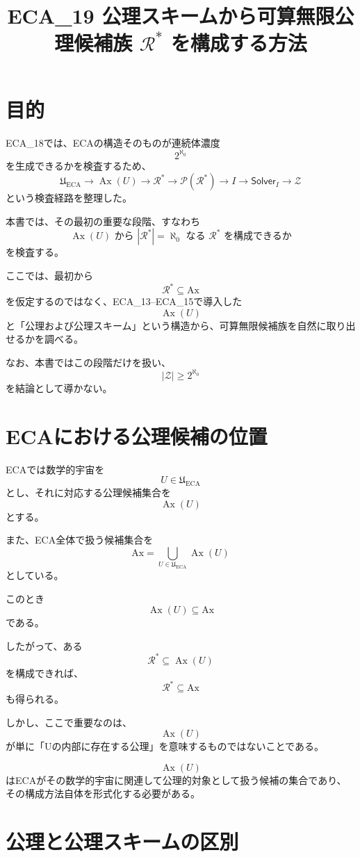 \documentclass[a4paper,11pt]{ltjsarticle}
\title{ECA_19 公理スキームから可算無限公理候補族 $\mathcal R^*$ を構成する方法}
\author{}
\date{}
\newcommand{\Ax}{\mathrm{Ax}}
\newcommand{\Solver}{\mathsf{Solver}}
\begin{document}
\maketitle

\section{目的}

ECA_18では、ECAの構造そのものが連続体濃度
\[
2^{\aleph_0}
\]
を生成できるかを検査するため、
\[
\mathfrak U_{\mathrm{ECA}}
\to
\operatorname{Ax}(U)
\to
\mathcal R^*
\to
\mathcal P(\mathcal R^*)
\to
I
\to
\Solver_I
\to
\mathcal Z
\]
という検査経路を整理した。

本書では、その最初の重要な段階、すなわち
\[
\boxed{
\operatorname{Ax}(U)
\text{ から }
|\mathcal R^*|=\aleph_0
\text{ なる }
\mathcal R^*
\text{ を構成できるか}
}
\]
を検査する。

ここでは、最初から
\[
\mathcal R^*\subseteq\Ax
\]
を仮定するのではなく、ECA_13--ECA_15で導入した
\[
\operatorname{Ax}(U)
\]
と「公理および公理スキーム」という構造から、可算無限候補族を自然に取り出せるかを調べる。

なお、本書ではこの段階だけを扱い、
\[
|\mathcal Z|\ge2^{\aleph_0}
\]
を結論として導かない。

\section{ECAにおける公理候補の位置}

ECAでは数学的宇宙を
\[
U\in\mathfrak U_{\mathrm{ECA}}
\]
とし、それに対応する公理候補集合を
\[
\operatorname{Ax}(U)
\]
とする。

また、ECA全体で扱う候補集合を
\[
\Ax
=
\bigcup_{U\in\mathfrak U_{\mathrm{ECA}}}
\operatorname{Ax}(U)
\]
としている。

このとき
\[
\operatorname{Ax}(U)\subseteq\Ax
\]
である。

したがって、ある
\[
\mathcal R^*\subseteq\operatorname{Ax}(U)
\]
を構成できれば、
\[
\mathcal R^*\subseteq\Ax
\]
も得られる。

しかし、ここで重要なのは、
\[
\operatorname{Ax}(U)
\]
が単に「Uの内部に存在する公理」を意味するものではないことである。

\[
\operatorname{Ax}(U)
\]
はECAがその数学的宇宙に関連して公理的対象として扱う候補の集合であり、その構成方法自体を形式化する必要がある。

\section{公理と公理スキームの区別}
\end{document}
